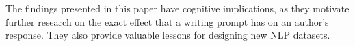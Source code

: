 \documentclass[11pt,a4paper]{article}
\newcommand{\resolved}[1]{}
\newcommand{\nascomment}[1]{{\color{blue}\textsc{[#1 --nas]}}}
\begin{document}
The findings presented in this paper have  cognitive implications, as
they motivate further research on the exact effect that a writing
prompt has on an author's response.
They also provide valuable lessons for designing new NLP datasets.
 \resolved{\nascomment{drop the last sentence, it makes this paper seem less
  complete} Future work will include testing whether other similar writing tasks, such as fake news, also impose their own unique and identifiable style on their authors.}




%
%



\end{document}
